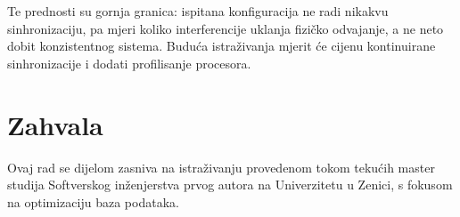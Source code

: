 \documentclass[10pt,conference,a4paper]{IEEEtran}
\begin{document}
Te prednosti su gornja granica: ispitana konfiguracija ne radi nikakvu
sinhronizaciju, pa mjeri koliko interferencije uklanja fizičko odvajanje, a ne
neto dobit konzistentnog sistema. Buduća istraživanja mjerit će cijenu
kontinuirane sinhronizacije i dodati profilisanje procesora.

\section*{Zahvala}
Ovaj rad se dijelom zasniva na istraživanju provedenom tokom tekućih master
studija Softverskog inženjerstva prvog autora na Univerzitetu u Zenici, s
fokusom na optimizaciju baza podataka.

\balance



\end{document}
